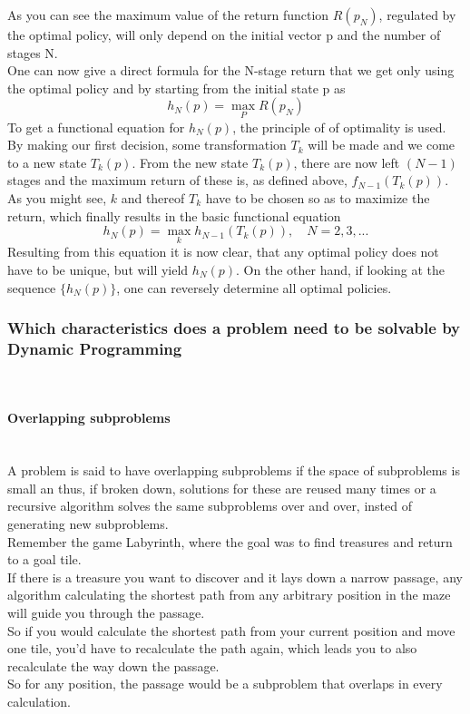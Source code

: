 \documentclass[conference]{IEEEtran}
\begin{document}
As you can see the maximum value of the return function $R(p_N)$, regulated by the optimal policy, will only depend on the initial vector p and the number of stages N.
\\
One can now give a direct formula for the N-stage return that we get only using the optimal policy and by starting from the initial state p as
\begin{equation}
h_N(p) = \max_P R(p_N)
\end{equation}
To get a functional equation for $h_N(p)$, the principle of of optimality is used. By making our first decision, some transformation $T_k$ will be made and we come to a new state $T_k(p)$.
From the new state $T_k(p)$, there are now left $(N-1)$ stages and the maximum return of these is, as defined above, $f_{N-1}(T_k(p))$. 
\\
As you might see, $k$ and thereof $T_k$ have to be chosen so as to maximize the return, which finally results in the basic functional equation
\begin{equation}
h_N(p) = \max_k h_{N-1}(T_k(p)), \quad N = 2, 3, ...
\end{equation}
Resulting from this equation it is now clear, that any optimal policy does not have to be unique, but will yield $h_N(p)$. On the other hand, if looking at the sequence $\{h_N(p)\}$, one can reversely determine all optimal policies.
\cite{Bellman.30.07.1954}\\
\subsubsection{Which characteristics does a problem need to be solvable by Dynamic Programming}
\quad \\
\paragraph{Overlapping subproblems}
\quad \\
A problem is said to have overlapping subproblems if the space of subproblems is small an thus, if broken down, solutions for these are reused many times or a recursive algorithm solves the same subproblems over and over, insted of generating new subproblems. \cite{Cormen.2007}
\\
Remember the game Labyrinth, where the goal was to find treasures and return to a goal tile.\\
If there is a treasure you want to discover and it lays down a narrow passage, any algorithm calculating the shortest path from any arbitrary position in the maze will guide you through the passage.\\
So if you would calculate the shortest path from your current position and move one tile, you'd have to recalculate the path again, which leads you to also recalculate the way down the passage.\\
So for any position, the passage would be a subproblem that overlaps in every calculation. 
\end{document}
